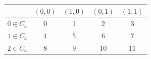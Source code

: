 \begin{center}\small
\begin{tabular}{c|cccc}
\toprule
 & $(0,0)$ & $(1,0)$ & $(0,1)$ & $(1,1)$\\
\midrule
$0\in C_3$ & 0 & 1 & 2 & 3\\
$1\in C_3$ & 4 & 5 & 6 & 7\\
$2\in C_3$ & 8 & 9 & 10 & 11\\
\bottomrule
\end{tabular}
\end{center}

